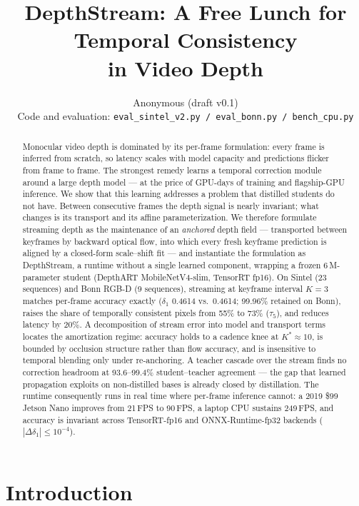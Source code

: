 \documentclass[10pt,twocolumn]{article}
\title{\LARGE\bf DepthStream: A Free Lunch for Temporal Consistency\\ in Video Depth}
\author{Anonymous (draft v0.1)\\ \small Code and evaluation: \texttt{eval\_sintel\_v2.py / eval\_bonn.py / bench\_cpu.py}}
\date{}
\begin{document}
\sloppy
\maketitle

\begin{abstract}
Monocular video depth is dominated by its per-frame formulation: every frame
is inferred from scratch, so latency scales with model capacity and
predictions flicker from frame to frame. The strongest remedy learns a
temporal correction module around a large depth model --- at the price of
GPU-days of training and flagship-GPU inference. We show that this learning
addresses a problem that distilled students do not have. Between consecutive
frames the depth signal is nearly invariant; what changes is its transport
and its affine parameterization. We therefore formulate streaming depth as
the maintenance of an \emph{anchored} depth field --- transported between
keyframes by backward optical flow, into which every fresh keyframe
prediction is aligned by a closed-form scale--shift fit --- and instantiate
the formulation as DepthStream, a runtime without a single learned
component, wrapping a frozen 6\,M-parameter student (DepthART
MobileNetV4-slim, TensorRT fp16). On Sintel (23 sequences) and Bonn RGB-D
(9 sequences), streaming at keyframe interval $K{=}3$ matches per-frame
accuracy exactly ($\delta_1$ 0.4614 vs.\ 0.4614; 99.96\% retained on Bonn),
raises the share of temporally consistent pixels from 55\% to 73\%
($\tau_5$), and reduces latency by 20\%. A decomposition of stream error
into model and transport terms locates the amortization regime: accuracy
holds to a cadence knee at $K^*{\approx}10$, is bounded by occlusion
structure rather than flow accuracy, and is insensitive to temporal blending
only under re-anchoring. A teacher cascade over the stream finds no
correction headroom at 93.6--99.4\% student--teacher agreement --- the gap
that learned propagation exploits on non-distilled bases is already closed
by distillation. The runtime consequently runs in real time where per-frame
inference cannot: a 2019 \$99 Jetson Nano improves from 21\,FPS to 90\,FPS,
a laptop CPU sustains 249\,FPS, and accuracy is invariant across
TensorRT-fp16 and ONNX-Runtime-fp32 backends ($|\Delta\delta_1|\leq10^{-4}$).
\end{abstract}

\section{Introduction}
\label{sec:intro}
\end{document}

